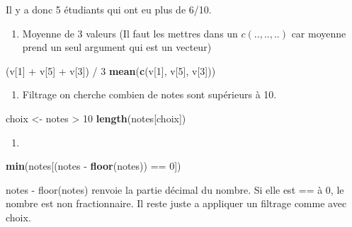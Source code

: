 \documentclass[
]{article}
\newenvironment{Shaded}{}{}
\newcommand{\DecValTok}[1]{\textcolor[rgb]{0.25,0.63,0.44}{#1}}
\newcommand{\KeywordTok}[1]{\textcolor[rgb]{0.00,0.44,0.13}{\textbf{#1}}}
\newcommand{\NormalTok}[1]{#1}
\newcommand{\OperatorTok}[1]{\textcolor[rgb]{0.40,0.40,0.40}{#1}}
\newcommand{\StringTok}[1]{\textcolor[rgb]{0.25,0.44,0.63}{#1}}
\providecommand{\tightlist}{%
  \setlength{\itemsep}{0pt}\setlength{\parskip}{0pt}}
\begin{document}
Il y a donc 5 étudiants qui ont eu plus de 6/10.

\begin{enumerate}
\def\labelenumi{\arabic{enumi}.}
\setcounter{enumi}{4}
\tightlist
\item
  Moyenne de 3 valeurs (Il faut les mettres dans un \(c(..,..,..)\) car
  moyenne prend un seul argument qui est un vecteur)
\end{enumerate}

\begin{Shaded}
\begin{Highlighting}[]
\NormalTok{(v[}\DecValTok{1}\NormalTok{] }\OperatorTok{+}\StringTok{ }\NormalTok{v[}\DecValTok{5}\NormalTok{] }\OperatorTok{+}\StringTok{ }\NormalTok{v[}\DecValTok{3}\NormalTok{]) }\OperatorTok{/}\StringTok{ }\DecValTok{3}  
\KeywordTok{mean}\NormalTok{(}\KeywordTok{c}\NormalTok{(v[}\DecValTok{1}\NormalTok{], v[}\DecValTok{5}\NormalTok{], v[}\DecValTok{3}\NormalTok{]))}
\end{Highlighting}
\end{Shaded}

\begin{enumerate}
\def\labelenumi{\arabic{enumi}.}
\setcounter{enumi}{5}
\tightlist
\item
  Filtrage on cherche combien de notes sont supérieurs à 10.
\end{enumerate}

\begin{Shaded}
\begin{Highlighting}[]
\NormalTok{choix \textless{}{-}}\StringTok{ }\NormalTok{notes }\OperatorTok{\textgreater{}}\StringTok{ }\DecValTok{10}  
\KeywordTok{length}\NormalTok{(notes[choix])}
\end{Highlighting}
\end{Shaded}

\begin{enumerate}
\def\labelenumi{\arabic{enumi}.}
\setcounter{enumi}{6}
\tightlist
\item
\end{enumerate}

\begin{Shaded}
\begin{Highlighting}[]
\KeywordTok{min}\NormalTok{(notes[(notes }\OperatorTok{{-}}\StringTok{ }\KeywordTok{floor}\NormalTok{(notes)) }\OperatorTok{==}\StringTok{ }\DecValTok{0}\NormalTok{])}
\end{Highlighting}
\end{Shaded}

notes - floor(notes) renvoie la partie décimal du nombre. Si elle est ==
à 0, le nombre est non fractionnaire. Il reste juste a appliquer un
filtrage comme avec choix.
\end{document}
